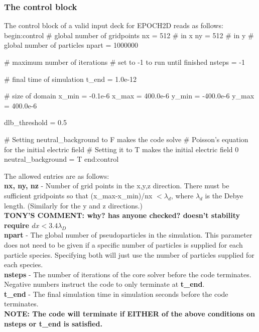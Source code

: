 \documentclass[12pt,a4paper]{article}
\newcommand{\emphtext}{\color{warwickdark} \fontfamily{phv}\selectfont\large\bf}
\newcommand{\inlineemph}[1]{{\color{warwicklight} \bf{#1}}}
\newcommand{\tony}[1]{{\color{warwickred} \bf{TONY'S COMMENT:} \bf{#1}}\\}
\newenvironment{boxverbatim}{\lboxverbatim{none}}{\endlboxverbatim}
\begin{document}
\subsubsection{The control block}
The control block of a valid input deck for EPOCH2D reads as follows:
\begin{boxverbatim}
begin:control
   # global number of gridpoints
   nx = 512 # in x
   ny = 512 # in y
   # global number of particles
   npart = 1000000

   # maximum number of iterations
   # set to -1 to run until finished
   nsteps = -1

   # final time of simulation
   t_end = 1.0e-12

   # size of domain
   x_min = -0.1e-6
   x_max = 400.0e-6
   y_min = -400.0e-6
   y_max = 400.0e-6

   dlb_threshold = 0.5

   # Setting neutral_background to F makes the code solve
   # Poisson's equation for the initial electric field
   # Setting it to T makes the initial electric field 0
   neutral_background = T
end:control
\end{boxverbatim}

The allowed entries are as follows:\\

{\emphtext nx, ny, nz} - Number of grid points in the x,y,z direction. There
must be sufficient gridpoints so that (x\_max-x\_min)/nx $< \lambda_d$, where
$\lambda_d$ is the Debye length. (Similarly for the y and z directions.)\\
\tony{why? has anyone checked? doesn't stability require $dx<3.4 \lambda_D$}

{\emphtext npart} - The global number of pseudoparticles in the
simulation. This parameter does not need to be given if a specific number
of particles is supplied for each particle species. Specifying both will just
use the number of particles supplied for each species.\\

{\emphtext nsteps} - The number of iterations of the core solver before the
code terminates. Negative numbers instruct the code to only terminate at
\inlineemph{t\_end}.\\

{\emphtext t\_end} - The final simulation time in simulation seconds before the
code terminates.\\

{\emphtext NOTE: The code will terminate if EITHER of the above conditions on
nsteps or t\_end is satisfied.}\\
\end{document}
